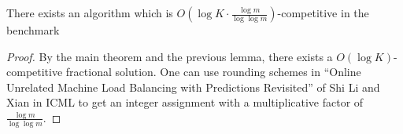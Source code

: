 \begin{theorem}
There exists an algorithm which is $O(\log K \cdot \frac{\log m}{ \log \log m})$-competitive in the benchmark
\end{theorem}
%
\begin{proof}
By the main theorem and the previous lemma, there exists a $O(\log K)$-competitive fractional solution.
One can use rounding schemes in ``Online Unrelated Machine Load Balancing with Predictions Revisited'' of Shi Li and Xian in ICML to get an integer assignment with a multiplicative factor of $\frac{\log m}{ \log \log m}$.
\end{proof}
